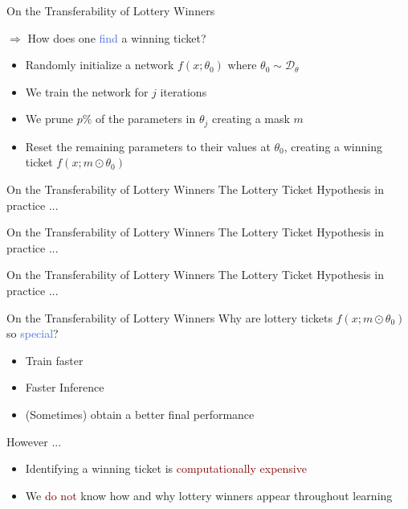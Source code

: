\documentclass{beamer}
\begin{document}
\begin{frame}{On the Transferability of Lottery Winners}

	$\Rightarrow$ How does one \textcolor{RoyalBlue}{find} a winning ticket?
	\bigskip
	
	\begin{itemize}
		\item Randomly initialize a network $f(x;\theta_0)$ where $\theta_0 \sim \mathscr{D}_{\theta}$
		\item We train the network for $j$ iterations
		\item We prune $p\%$ of the parameters in $\theta_j$ creating a mask $m$
		\item Reset the remaining parameters to their values at $\theta_0$, creating a winning ticket $f(x;m \odot \theta_0)$
	\end{itemize}

\end{frame}


\begin{frame}{On the Transferability of Lottery Winners}
	The Lottery Ticket Hypothesis in practice ...

	
\end{frame}

\begin{frame}{On the Transferability of Lottery Winners}
	The Lottery Ticket Hypothesis in practice ...

	
\end{frame}



\begin{frame}{On the Transferability of Lottery Winners}
	The Lottery Ticket Hypothesis in practice ...

	
\end{frame}

\begin{frame}{On the Transferability of Lottery Winners}
	Why are lottery tickets $f(x;m \odot \theta_0)$ so \textcolor{RoyalBlue}{special}?
	\begin{itemize}
		\item Train faster
		\item Faster Inference
		\item (Sometimes) obtain a better final performance
	\end{itemize}
	\bigskip
	However ... 

	\begin{itemize}
		\item Identifying a winning ticket is \textcolor{Maroon}{computationally expensive} 
		\item We \textcolor{Maroon}{do not} know how and why lottery winners appear throughout learning
	\end{itemize}
\end{frame}
\end{document}
